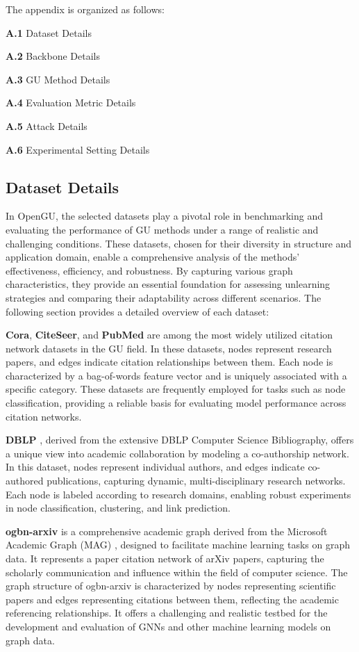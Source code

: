 \balance
The appendix is organized as follows:

\noindent\textbf{A.1} Dataset Details

\noindent\textbf{A.2} Backbone Details

\noindent\textbf{A.3} GU Method Details

\noindent\textbf{A.4} Evaluation Metric Details

\noindent\textbf{A.5} Attack Details

\noindent\textbf{A.6} Experimental Setting Details

\subsection{Dataset Details}
\label{A.Dataset}
In OpenGU, the selected datasets play a pivotal role in benchmarking and evaluating the performance of GU methods under a range of realistic and challenging conditions. These datasets, chosen for their diversity in structure and application domain, enable a comprehensive analysis of the methods’ effectiveness, efficiency, and robustness. By capturing various graph characteristics, they provide an essential foundation for assessing unlearning strategies and comparing their adaptability across different scenarios. The following section provides a detailed overview of each dataset:

\textbf{Cora}, \textbf{CiteSeer}, and \textbf{PubMed} \cite{Yang16cora} are among the most widely utilized citation network datasets in the GU field. In these datasets, nodes represent research papers, and edges indicate citation relationships between them. Each node is characterized by a bag-of-words feature vector and is uniquely associated with a specific category. These datasets are frequently employed for tasks such as node classification, providing a reliable basis for evaluating model performance across citation networks.

\textbf{DBLP} \cite{2019DBLP}, derived from the extensive DBLP Computer Science Bibliography, offers a unique view into academic collaboration by modeling a co-authorship network. In this dataset, nodes represent individual authors, and edges indicate co-authored publications, capturing dynamic, multi-disciplinary research networks. Each node is labeled according to research domains, enabling robust experiments in node classification, clustering, and link prediction.

\textbf{ogbn-arxiv} \cite{hu2020ogb} is a comprehensive academic graph derived from the Microsoft Academic Graph (MAG) \cite{wang2020microsoft_MAG}, designed to facilitate machine learning tasks on graph data. It represents a paper citation network of arXiv papers, capturing the scholarly communication and influence within the field of computer science. The graph structure of ogbn-arxiv is characterized by nodes representing scientific papers and edges representing citations between them, reflecting the academic referencing relationships. It offers a challenging and realistic testbed for the development and evaluation of GNNs and other machine learning models on graph data.

